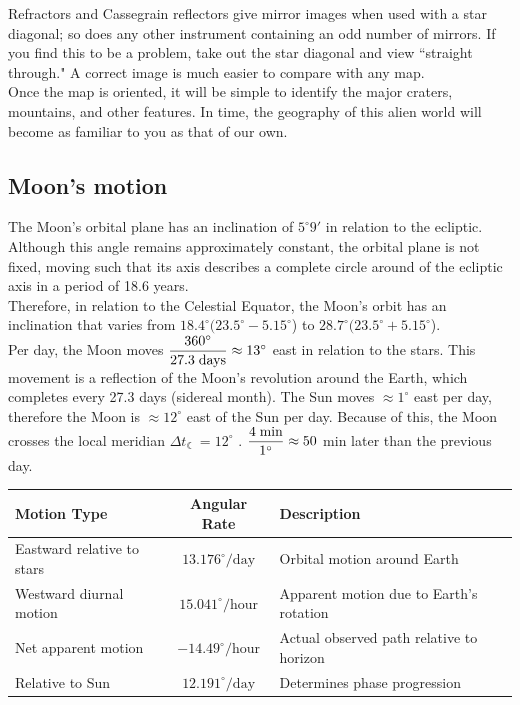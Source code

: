 \documentclass[a4paper,12pt]{extarticle}
\begin{document}
Refractors and Cassegrain reflectors give mirror images when used with a star diagonal; so does any other instrument containing an odd number of mirrors. If you find this to be a problem, take out the star diagonal and view ``straight through." A correct image is much easier to compare with any map.\\

Once the map is oriented, it will be simple to identify the major craters, mountains, and other features. In time, the geography of this alien world will become as familiar to you as that of our own.

\subsection{Moon's motion}

The Moon's orbital plane has an inclination of $5^\circ9'$ in relation to the ecliptic. Although this angle remains approximately constant, the orbital plane is not fixed, moving such that its axis describes a complete circle around of the ecliptic axis in a period of 18.6 years.\\

Therefore, in relation to the Celestial Equator, the Moon's orbit has an inclination that varies from $18.4^\circ(23.5^\circ - 5.15^\circ$) to $28.7^\circ(23.5^\circ + 5.15^\circ$).\\

Per day, the Moon moves $\dfrac{360^\circ}{27.3 \;\rm days} \approx 13^\circ$ east in relation to the stars. This movement is a reflection of the Moon's revolution around the Earth, which completes every 27.3 days (sidereal month). The Sun moves $\approx 1^\circ$ east per day, therefore the Moon is $\approx 12^\circ$ east of the Sun per day. Because of this, the Moon crosses the local meridian $\Delta t_{\leftmoon}= 12^\circ$ . $\dfrac{4 \;\rm min}{1^\circ} \approx 50$ min later than the previous day.

\begin{table}[H]
	\centering
	\begin{tabular}{|l|c|l|}
		\hline
		\textbf{Motion Type} & \textbf{Angular Rate} & \textbf{Description} \\ \hline
		Eastward relative to stars & $13.176^\circ/\text{day}$ & Orbital motion around Earth \\ \hline
		Westward diurnal motion & $15.041^\circ/\text{hour}$ & Apparent motion due to Earth's rotation \\ \hline
		Net apparent motion & $-14.49^\circ/\text{hour}$ & Actual observed path relative to horizon \\ \hline
		Relative to Sun & $12.191^\circ/\text{day}$ & Determines phase progression \\ \hline
	\end{tabular}
\end{table}
\end{document}
